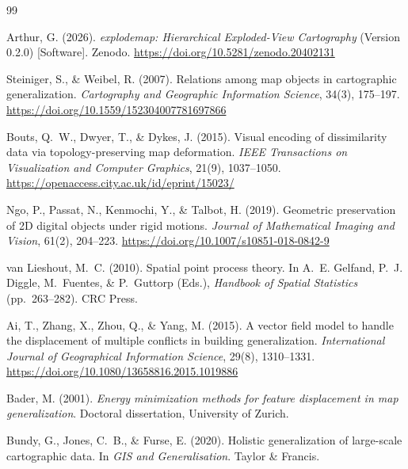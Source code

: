 \documentclass[12pt, a4paper]{article}
\numberwithin{equation}{section}
\begin{document}

\begin{thebibliography}{99}


Arthur, G. (2026).
\textit{explodemap: Hierarchical Exploded-View Cartography} (Version 0.2.0)
[Software].
Zenodo.
\url{https://doi.org/10.5281/zenodo.20402131}


Steiniger, S., \& Weibel, R. (2007).
Relations among map objects in cartographic generalization.
\textit{Cartography and Geographic Information Science}, 34(3), 175--197.
\url{https://doi.org/10.1559/152304007781697866}

Bouts, Q.~W., Dwyer, T., \& Dykes, J. (2015).
Visual encoding of dissimilarity data via topology-preserving map deformation.
\textit{IEEE Transactions on Visualization and Computer Graphics}, 21(9), 1037--1050.
\url{https://openaccess.city.ac.uk/id/eprint/15023/}

Ngo, P., Passat, N., Kenmochi, Y., \& Talbot, H. (2019).
Geometric preservation of 2D digital objects under rigid motions.
\textit{Journal of Mathematical Imaging and Vision}, 61(2), 204--223.
\url{https://doi.org/10.1007/s10851-018-0842-9}

van Lieshout, M.~C. (2010).
Spatial point process theory.
In A.~E. Gelfand, P.~J. Diggle, M.~Fuentes, \& P.~Guttorp (Eds.),
\textit{Handbook of Spatial Statistics} (pp.~263--282). CRC Press.

Ai, T., Zhang, X., Zhou, Q., \& Yang, M. (2015).
A vector field model to handle the displacement of multiple conflicts in
building generalization.
\textit{International Journal of Geographical Information Science}, 29(8),
1310--1331.
\url{https://doi.org/10.1080/13658816.2015.1019886}

Bader, M. (2001).
\textit{Energy minimization methods for feature displacement in map
generalization}.
Doctoral dissertation, University of Zurich.

Bundy, G., Jones, C.~B., \& Furse, E. (2020).
Holistic generalization of large-scale cartographic data.
In \textit{GIS and Generalisation}. Taylor \& Francis.


\end{thebibliography}
\end{document}
